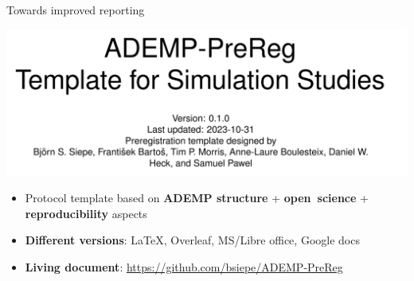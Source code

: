 \documentclass[english, 12pt, aspectratio=169]{beamer}
\begin{document}
\begin{frame}{Towards improved reporting}
  \begin{block}{}
  \centering
  \includegraphics[width = 0.6\linewidth,frame]{pics/ademprereg.png}

  \begin{itemize}
  \pause
    \item Protocol template based on \alert{\textbf{ADEMP structure}}
          \citep{Morris2019} + \alert{\textbf{open~science}} +
          \alert{\textbf{reproducibility}} aspects
    \pause
    \item \alert{\textbf{Different versions}}: \LaTeX, Overleaf, MS/Libre office, Google
    docs
    \pause
    \item \alert{\textbf{Living
          document}}:          \href{https://github.com/bsiepe/ADEMP-PreReg}{https://github.com/bsiepe/ADEMP-PreReg}
    \end{itemize}
  \end{block}

  \vspace{-1.5em}
  \nocite{Siepe2023}

\end{frame}
\end{document}

